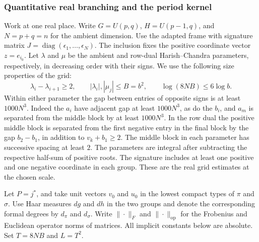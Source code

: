 \subsubsection{Quantitative real branching and the period kernel}\label{sec:principal-real-bounds}
Work at one real place. Write \(G=U(p,q)\), \(H=U(p-1,q)\), and
\(N=p+q=n\) for the ambient dimension. Use the adapted frame with
signature matrix \(J=\operatorname{diag}(\epsilon_1,\ldots,\epsilon_N)\).
The inclusion fixes the positive coordinate vector \(z=e_{i_0}\).
Let \(\lambda\) and \(\mu\) be the ambient and row-dual Harish--Chandra
parameters, respectively, in decreasing order with their signs. We use
the following size properties of the grid:
\[
 \lambda_i-\lambda_{i+1}\ge 2,\qquad
 |\lambda_i|,|\mu_j|\le B=b^2,\qquad
 \log(8NB)\le 6\log b .
\]
Within either parameter the gap between entries of opposite signs is
at least \(1000N^3\). Indeed the \(a_i\) have adjacent gap at least
\(1000N^3\), as do the \(b_i\), and \(a_m\) is separated from the middle
block by at least \(1000N^3\). In the row dual the positive middle block
is separated from the first negative entry in the final block by the
gap \(b_2-b_1\), in addition to \(v_k+b_1\ge 2\). The middle block in
each parameter has successive spacing at least \(2\). The parameters
are integral after subtracting the respective half-sum of positive
roots. The signature includes at least one positive and one negative
coordinate in each group. These are the real grid estimates at the
chosen scale.

Let \(P=j^*\), and take unit vectors \(v_0\) and \(u_0\) in the lowest
compact types of \(\pi\) and \(\sigma\). Use Haar measures \(dg\) and
\(dh\) in the two groups and denote the corresponding formal degrees
by \(d_\pi\) and \(d_\sigma\). Write \(\|\cdot\|_F\) and
\(\|\cdot\|_{\mathrm{op}}\) for the Frobenius and Euclidean operator
norms of matrices. All implicit constants below are absolute. Set
\(T=8NB\) and \(L=T^2\).

